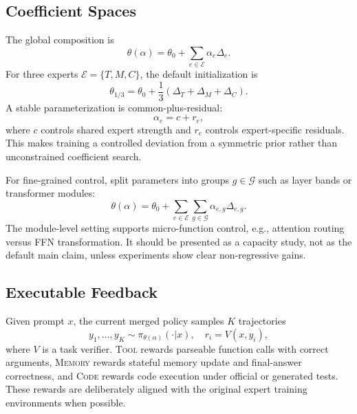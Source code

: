 \documentclass[11pt]{article}
\newcommand{\tool}{\textsc{Tool}\xspace}
\newcommand{\mem}{\textsc{Memory}\xspace}
\newcommand{\code}{\textsc{Code}\xspace}
\newcommand{\eqmerge}{\theta_{1/3}}
\begin{document}
\subsection{Coefficient Spaces}

The global composition is
\begin{equation}
    \theta(\alpha)=\theta_0+\sum_{e\in\mathcal{E}}\alpha_e\Delta_e.
\end{equation}
For three experts $\mathcal{E}=\{T,M,C\}$, the default initialization is
\begin{equation}
    \eqmerge=\theta_0+\frac{1}{3}(\Delta_T+\Delta_M+\Delta_C).
\end{equation}
A stable parameterization is common-plus-residual:
\begin{equation}
    \alpha_e=c+r_e,
\end{equation}
where $c$ controls shared expert strength and $r_e$ controls expert-specific residuals.  This makes training a controlled deviation from a symmetric prior rather than unconstrained coefficient search.

For fine-grained control, split parameters into groups $g\in\mathcal{G}$ such as layer bands or transformer modules:
\begin{equation}
    \theta(\alpha)=\theta_0+\sum_{e\in\mathcal{E}}\sum_{g\in\mathcal{G}}\alpha_{e,g}\Delta_{e,g}.
\end{equation}
The module-level setting supports micro-function control, e.g., attention routing versus FFN transformation.  It should be presented as a capacity study, not as the default main claim, unless experiments show clear non-regressive gains.

\subsection{Executable Feedback}

Given prompt $x$, the current merged policy samples $K$ trajectories
\begin{equation}
    y_1,\ldots,y_K\sim\pi_{\theta(\alpha)}(\cdot|x),\quad r_i=V(x,y_i),
\end{equation}
where $V$ is a task verifier.  \tool rewards parseable function calls with correct arguments, \mem rewards stateful memory update and final-answer correctness, and \code rewards code execution under official or generated tests.  These rewards are deliberately aligned with the original expert training environments when possible.
\end{document}
